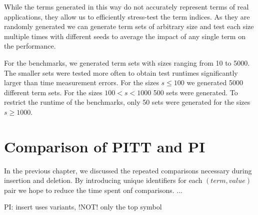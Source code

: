 While the terms generated in this way do not accurately represent terms of real applications, they allow us to efficiently stress-test the term indices. As they are randomly generated we can generate term sets of arbitrary size and test each size multiple times with different seeds to average the impact of any single term on the performance.

For the benchmarks, we generated term sets with sizes ranging from 10 to 5000. The smaller sets were tested more often to obtain test runtimes significantly larger than time measurement errors. For the sizes $s \leq 100$ we generated 5000 different term sets. For the sizes $100 < s < 1000$ 500 sets were generated. To restrict the runtime of the benchmarks, only 50 sets were generated for the sizes $s \geq 1000$.


\section{Comparison of PITT and PI}
In the previous chapter, we discussed the repeated comparisons necessary during insertion and deletion. By introducing unique identifiers for each $(term,value)$ pair we hope to reduce the time spent onf comparisons. ...

PI: insert uses variants, !NOT! only the top symbol

